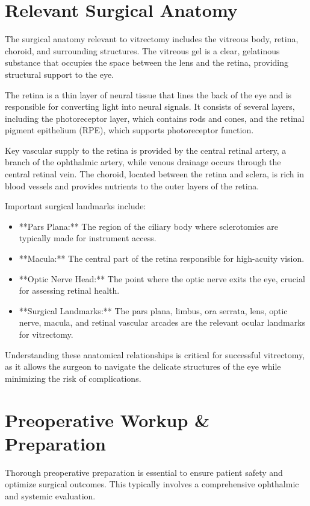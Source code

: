 \section*{Relevant Surgical Anatomy}
The surgical anatomy relevant to vitrectomy includes the vitreous body, retina, choroid, and surrounding structures. The vitreous gel is a clear, gelatinous substance that occupies the space between the lens and the retina, providing structural support to the eye. 

The retina is a thin layer of neural tissue that lines the back of the eye and is responsible for converting light into neural signals. It consists of several layers, including the photoreceptor layer, which contains rods and cones, and the retinal pigment epithelium (RPE), which supports photoreceptor function. 

Key vascular supply to the retina is provided by the central retinal artery, a branch of the ophthalmic artery, while venous drainage occurs through the central retinal vein. The choroid, located between the retina and sclera, is rich in blood vessels and provides nutrients to the outer layers of the retina.

Important surgical landmarks include:

\begin{itemize}
  \item **Pars Plana:** The region of the ciliary body where sclerotomies are typically made for instrument access.
  \item **Macula:** The central part of the retina responsible for high-acuity vision.
  \item **Optic Nerve Head:** The point where the optic nerve exits the eye, crucial for assessing retinal health.
  \item **Surgical Landmarks:** The pars plana, limbus, ora serrata, lens, optic nerve, macula, and retinal vascular arcades are the relevant ocular landmarks for vitrectomy.
\end{itemize}

Understanding these anatomical relationships is critical for successful vitrectomy, as it allows the surgeon to navigate the delicate structures of the eye while minimizing the risk of complications.

\section*{Preoperative Workup \& Preparation}
Thorough preoperative preparation is essential to ensure patient safety and optimize surgical outcomes. This typically involves a comprehensive ophthalmic and systemic evaluation.

